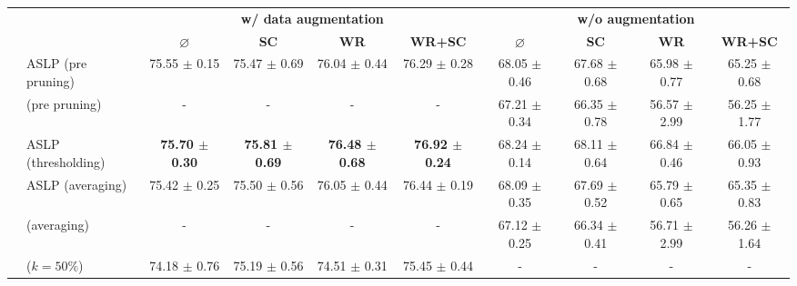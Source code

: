 \begin{table}
  \centering
  \resizebox{16.5cm}{!} {
    \begin{tabular}{llcccccccc}
      \cmidrule[\heavyrulewidth]{3-10}
        &  & \multicolumn{4}{c}{\textbf{w/ data augmentation}} & \multicolumn{4}{c}{\textbf{w/o augmentation}} \\
       &  &  $\varnothing$ & \textbf{SC} & \textbf{WR} & \textbf{WR+SC} & $\varnothing$ & \textbf{SC} & \textbf{WR} & \textbf{WR+SC} \\
      \toprule

      \multirow{18}{*}{} \multirow{6}{*}{\textbf{Conv2}} & ASLP (pre pruning) & 75.55 $\pm$ 0.15 & 75.47 $\pm$ 0.69 & 76.04 $\pm$ 0.44 & 76.29 $\pm$ 0.28 & 68.05 $\pm$ 0.46 & 67.68 $\pm$ 0.68 & 65.98 $\pm$ 0.77 & 65.25 $\pm$ 0.68 \\
        & \cite{DBLP:conf/nips/ZhouLLY19} (pre pruning) & - & - & - & - & 67.21 $\pm$ 0.34 & 66.35 $\pm$ 0.78 & 56.57 $\pm$ 2.99 & 56.25 $\pm$ 1.77 \\
      \cmidrule(lr){2-10}
        & ASLP (thresholding) & \textbf{75.70 $\pm$ 0.30} & \textbf{75.81 $\pm$ 0.69} & \textbf{76.48 $\pm$ 0.68} & \textbf{76.92 $\pm$ 0.24} & 68.24 $\pm$ 0.14 & 68.11 $\pm$ 0.64 & 66.84 $\pm$ 0.46 & 66.05 $\pm$ 0.93 \\
        & ASLP (averaging)& 75.42 $\pm$ 0.25 & 75.50 $\pm$ 0.56 & 76.05 $\pm$ 0.44 & 76.44 $\pm$ 0.19 & 68.09 $\pm$ 0.35 & 67.69 $\pm$ 0.52 & 65.79 $\pm$ 0.65 & 65.35 $\pm$ 0.83 \\
        & \cite{DBLP:conf/nips/ZhouLLY19} (averaging)& - & - & - & - & 67.12 $\pm$ 0.25 & 66.34 $\pm$ 0.41 & 56.71 $\pm$ 2.99 & 56.26 $\pm$ 1.64 \\
        & \cite{DBLP:conf/cvpr/RamanujanWKFR20} ($k=50\%$) & 74.18 $\pm$ 0.76 & 75.19 $\pm$ 0.56 & 74.51 $\pm$ 0.31 & 75.45 $\pm$ 0.44 & - & - & - & - \\
      \midrule


\end{tabular}}
\end{table}
